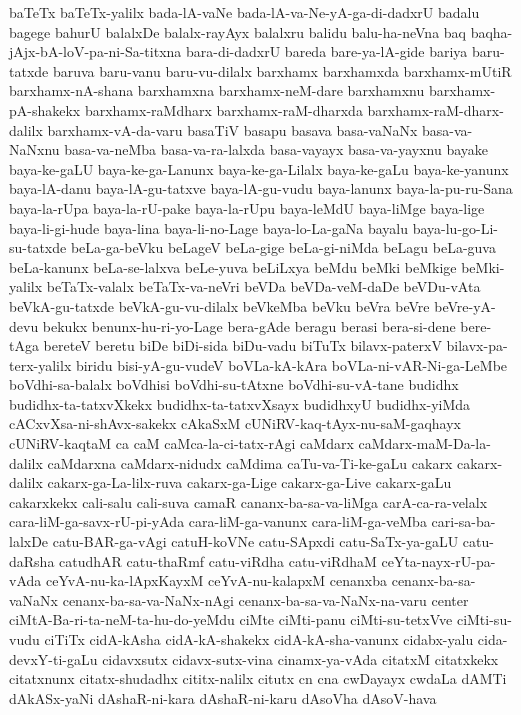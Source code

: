 {baTeTx
baTeTx-yalilx
bada-lA-vaNe
bada-lA-va-Ne-yA-ga-di-dadxrU
badalu
bagege
bahurU
balalxDe
balalx-rayAyx
balalxru
balidu
balu-ha-neVna
baq
baqha-jAjx-bA-loV-pa-ni-Sa-titxna
bara-di-dadxrU
bareda
bare-ya-lA-gide
bariya
baru-tatxde
baruva
baru-vanu
baru-vu-dilalx
barxhamx
barxhamxda
barxhamx-mUtiR
barxhamx-nA-shana
barxhamxna
barxhamx-neM-dare
barxhamxnu
barxhamx-pA-shakekx
barxhamx-raMdharx
barxhamx-raM-dharxda
barxhamx-raM-dharx-dalilx
barxhamx-vA-da-varu
basaTiV
basapu
basava
basa-vaNaNx
basa-va-NaNxnu
basa-va-neMba
basa-va-ra-lalxda
basa-vayayx
basa-va-yayxnu
bayake
baya-ke-gaLU
baya-ke-ga-Lanunx
baya-ke-ga-Lilalx
baya-ke-gaLu
baya-ke-yanunx
baya-lA-danu
baya-lA-gu-tatxve
baya-lA-gu-vudu
baya-lanunx
baya-la-pu-ru-Sana
baya-la-rUpa
baya-la-rU-pake
baya-la-rUpu
baya-leMdU
baya-liMge
baya-lige
baya-li-gi-hude
baya-lina
baya-li-no-Lage
baya-lo-La-gaNa
bayalu
baya-lu-go-Li-su-tatxde
beLa-ga-beVku
beLageV
beLa-gige
beLa-gi-niMda
beLagu
beLa-guva
beLa-kanunx
beLa-se-lalxva
beLe-yuva
beLiLxya
beMdu
beMki
beMkige
beMki-yalilx
beTaTx-valalx
beTaTx-va-neVri
beVDa
beVDa-veM-daDe
beVDu-vAta
beVkA-gu-tatxde
beVkA-gu-vu-dilalx
beVkeMba
beVku
beVra
beVre
beVre-yA-devu
bekukx
benunx-hu-ri-yo-Lage
bera-gAde
beragu
berasi
bera-si-dene
bere-tAga
bereteV
beretu
biDe
biDi-sida
biDu-vadu
biTuTx
bilavx-paterxV
bilavx-pa-terx-yalilx
biridu
bisi-yA-gu-vudeV
boVLa-kA-kAra
boVLa-ni-vAR-Ni-ga-LeMbe
boVdhi-sa-balalx
boVdhisi
boVdhi-su-tAtxne
boVdhi-su-vA-tane
budidhx
budidhx-ta-tatxvXkekx
budidhx-ta-tatxvXsayx
budidhxyU
budidhx-yiMda
cACxvXsa-ni-shAvx-sakekx
cAkaSxM
cUNiRV-kaq-tAyx-nu-saM-gaqhayx
cUNiRV-kaqtaM
ca
caM
caMca-la-ci-tatx-rAgi
caMdarx
caMdarx-maM-Da-la-dalilx
caMdarxna
caMdarx-nidudx
caMdima
caTu-va-Ti-ke-gaLu
cakarx
cakarx-dalilx
cakarx-ga-La-lilx-ruva
cakarx-ga-Lige
cakarx-ga-Live
cakarx-gaLu
cakarxkekx
cali-salu
cali-suva
camaR
cananx-ba-sa-va-liMga
carA-ca-ra-velalx
cara-liM-ga-savx-rU-pi-yAda
cara-liM-ga-vanunx
cara-liM-ga-veMba
cari-sa-ba-lalxDe
catu-BAR-ga-vAgi
catuH-koVNe
catu-SApxdi
catu-SaTx-ya-gaLU
catu-daRsha
catudhAR
catu-thaRmf
catu-viRdha
catu-viRdhaM
ceYta-nayx-rU-pa-vAda
ceYvA-nu-ka-lApxKayxM
ceYvA-nu-kalapxM
cenanxba
cenanx-ba-sa-vaNaNx
cenanx-ba-sa-va-NaNx-nAgi
cenanx-ba-sa-va-NaNx-na-varu
center
ciMtA-Ba-ri-ta-neM-ta-hu-do-yeMdu
ciMte
ciMti-panu
ciMti-su-tetxVve
ciMti-su-vudu
ciTiTx
cidA-kAsha
cidA-kA-shakekx
cidA-kA-sha-vanunx
cidabx-yalu
cida-devxY-ti-gaLu
cidavxsutx
cidavx-sutx-vina
cinamx-ya-vAda
citatxM
citatxkekx
citatxnunx
citatx-shudadhx
cititx-nalilx
citutx
cn
cna
cwDayayx
cwdaLa
dAMTi
dAkASx-yaNi
dAshaR-ni-kara
dAshaR-ni-karu
dAsoVha
dAsoV-hava
}
